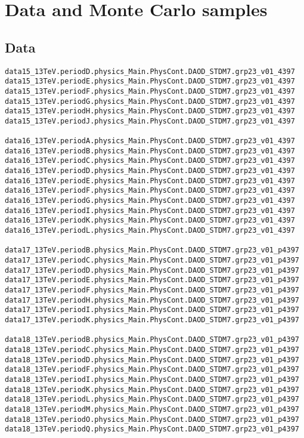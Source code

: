 \section{Data and Monte Carlo samples}
\label{app:datasets}

\subsection{Data}
\begin{tiny}
\begin{verbatim}
data15_13TeV.periodD.physics_Main.PhysCont.DAOD_STDM7.grp23_v01_4397
data15_13TeV.periodE.physics_Main.PhysCont.DAOD_STDM7.grp23_v01_4397
data15_13TeV.periodF.physics_Main.PhysCont.DAOD_STDM7.grp23_v01_4397
data15_13TeV.periodG.physics_Main.PhysCont.DAOD_STDM7.grp23_v01_4397
data15_13TeV.periodH.physics_Main.PhysCont.DAOD_STDM7.grp23_v01_4397
data15_13TeV.periodJ.physics_Main.PhysCont.DAOD_STDM7.grp23_v01_4397

data16_13TeV.periodA.physics_Main.PhysCont.DAOD_STDM7.grp23_v01_4397
data16_13TeV.periodB.physics_Main.PhysCont.DAOD_STDM7.grp23_v01_4397
data16_13TeV.periodC.physics_Main.PhysCont.DAOD_STDM7.grp23_v01_4397
data16_13TeV.periodD.physics_Main.PhysCont.DAOD_STDM7.grp23_v01_4397
data16_13TeV.periodE.physics_Main.PhysCont.DAOD_STDM7.grp23_v01_4397
data16_13TeV.periodF.physics_Main.PhysCont.DAOD_STDM7.grp23_v01_4397
data16_13TeV.periodG.physics_Main.PhysCont.DAOD_STDM7.grp23_v01_4397
data16_13TeV.periodI.physics_Main.PhysCont.DAOD_STDM7.grp23_v01_4397
data16_13TeV.periodK.physics_Main.PhysCont.DAOD_STDM7.grp23_v01_4397
data16_13TeV.periodL.physics_Main.PhysCont.DAOD_STDM7.grp23_v01_4397

data17_13TeV.periodB.physics_Main.PhysCont.DAOD_STDM7.grp23_v01_p4397
data17_13TeV.periodC.physics_Main.PhysCont.DAOD_STDM7.grp23_v01_p4397
data17_13TeV.periodD.physics_Main.PhysCont.DAOD_STDM7.grp23_v01_p4397
data17_13TeV.periodE.physics_Main.PhysCont.DAOD_STDM7.grp23_v01_p4397
data17_13TeV.periodF.physics_Main.PhysCont.DAOD_STDM7.grp23_v01_p4397
data17_13TeV.periodH.physics_Main.PhysCont.DAOD_STDM7.grp23_v01_p4397
data17_13TeV.periodI.physics_Main.PhysCont.DAOD_STDM7.grp23_v01_p4397
data17_13TeV.periodK.physics_Main.PhysCont.DAOD_STDM7.grp23_v01_p4397

data18_13TeV.periodB.physics_Main.PhysCont.DAOD_STDM7.grp23_v01_p4397
data18_13TeV.periodC.physics_Main.PhysCont.DAOD_STDM7.grp23_v01_p4397
data18_13TeV.periodD.physics_Main.PhysCont.DAOD_STDM7.grp23_v01_p4397
data18_13TeV.periodF.physics_Main.PhysCont.DAOD_STDM7.grp23_v01_p4397
data18_13TeV.periodI.physics_Main.PhysCont.DAOD_STDM7.grp23_v01_p4397
data18_13TeV.periodK.physics_Main.PhysCont.DAOD_STDM7.grp23_v01_p4397
data18_13TeV.periodL.physics_Main.PhysCont.DAOD_STDM7.grp23_v01_p4397
data18_13TeV.periodM.physics_Main.PhysCont.DAOD_STDM7.grp23_v01_p4397
data18_13TeV.periodO.physics_Main.PhysCont.DAOD_STDM7.grp23_v01_p4397
data18_13TeV.periodQ.physics_Main.PhysCont.DAOD_STDM7.grp23_v01_p4397

\end{verbatim}
\end{tiny}

